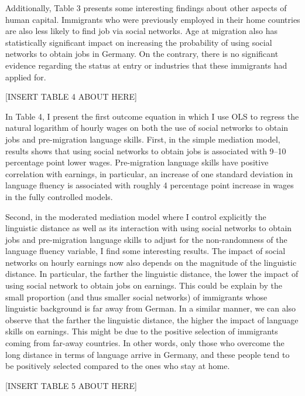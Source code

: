\documentclass[12pt,a4paper]{article}
\begin{document}
Additionally, Table 3 presents some interesting findings about other aspects of human capital. Immigrants who were previously employed in their home countries are also less likely to find job via social networks. Age at migration also has statistically significant impact on increasing the probability of using social networks to obtain jobs in Germany. On the contrary, there is no significant evidence regarding the status at entry or industries that these immigrants had applied for.

\begin{center}
[INSERT TABLE 4 ABOUT HERE]
\end{center}

In Table 4, I present the first outcome equation in which I use OLS to regress the natural logarithm of hourly wages on both the use of social networks to obtain jobs and pre-migration language skills. First, in the simple mediation model, results shows that using social networks to obtain jobs is associated with 9--10 percentage point lower wages. Pre-migration language skills have positive correlation with earnings, in particular, an increase of one standard deviation in language fluency is associated with roughly 4 percentage point increase in wages in the fully controlled models. 

Second, in the moderated mediation model where I control explicitly the linguistic distance as well as its interaction with using social networks to obtain jobs and pre-migration language skills to adjust for the non-randomness of the language fluency variable, I find some interesting results. The impact of social networks on hourly earnings now also depends on the magnitude of the linguistic distance. In particular, the farther the linguistic distance, the lower the impact of using social network to obtain jobs on earnings. This could be explain by the small proportion (and thus smaller social networks) of immigrants whose linguistic background is far away from German. In a similar manner, we can also observe that the farther the linguistic distance, the higher the impact of language skills on earnings. This might be due to the positive selection of immigrants coming from far-away countries. In other words, only those who overcome the long distance in terms of language arrive in Germany, and these people tend to be positively selected compared to the ones who stay at home.

\begin{center}
[INSERT TABLE 5 ABOUT HERE]
\end{center}
\end{document}
